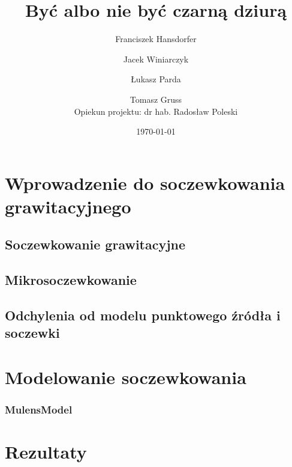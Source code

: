 \documentclass{beamer}
\title{Być albo nie być czarną dziurą}
\author[F. Hansdorfer \and J. Winiarczyk \and Ł. Parda
\and T. Gruss]{Franciszek Hansdorfer \and Jacek Winiarczyk \and Łukasz Parda
\and Tomasz Gruss\\{\small Opiekun projektu: dr hab. Radosław Poleski}}
\date{\today}
\begin{document}
\begin{frame}
    \titlepage
\end{frame}

\section{Wprowadzenie do soczewkowania grawitacyjnego}

\subsection{Soczewkowanie grawitacyjne}

\subsection{Mikrosoczewkowanie}
\subsection{Odchylenia od modelu punktowego źródła i soczewki}

\section{Modelowanie soczewkowania}
\subsubsection{MulensModel}

\section{Rezultaty}
\end{document}
